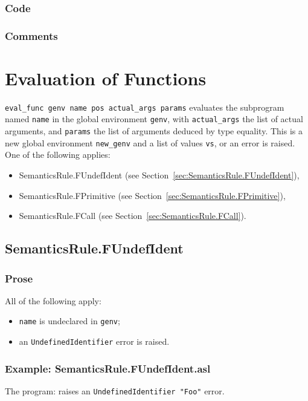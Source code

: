 \documentclass{book}
\begin{document}
  \subsection{Code}

    \subsection{Comments}

\chapter{Evaluation of Functions \label{chap:eval_func}}
\texttt{eval\_func genv name pos actual\_args params} evaluates the subprogram
named \texttt{name} in the global environment \texttt{genv}, with
\texttt{actual\_args} the list of actual arguments, and \texttt{params} the
list of arguments deduced by type equality. This is a new global environment
\texttt{new\_genv} and a list of values \texttt{vs}, or an error is raised.
One of the following applies:
\begin{itemize}
\item SemanticsRule.FUndefIdent (see Section~\ref{sec:SemanticsRule.FUndefIdent}),
\item SemanticsRule.FPrimitive (see Section~\ref{sec:SemanticsRule.FPrimitive}),
\item SemanticsRule.FCall (see Section~\ref{sec:SemanticsRule.FCall}).
\end{itemize}

\section{SemanticsRule.FUndefIdent \label{sec:SemanticsRule.FUndefIdent}}

  \subsection{Prose}
  All of the following apply:
  \begin{itemize}
  \item \texttt{name} is undeclared in \texttt{genv};
  \item an \texttt{UndefinedIdentifier} error is raised.
  \end{itemize}

  \subsection{Example: SemanticsRule.FUndefIdent.asl}
  The program:
  raises an \texttt{UndefinedIdentifier "Foo"} error.
\end{document}
